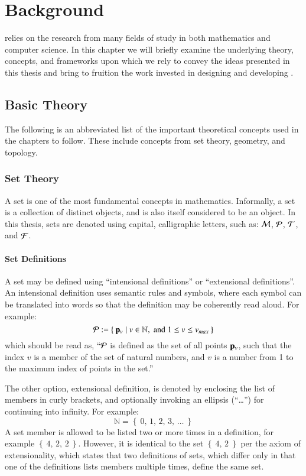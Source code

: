 \chapter{Background}
\label{ch2}
 relies on the research from many fields of study in both mathematics and computer science. In this chapter we will briefly examine the underlying theory, concepts, and frameworks upon which we rely to convey the ideas presented in this thesis and bring to fruition the work invested in designing and developing .

%
%
%
%
\section{Basic Theory}
The following is an abbreviated list of the important theoretical concepts used in the chapters to follow. These include concepts from set theory, geometry, and topology.

%
%
\subsection{Set Theory}
A set is one of the most fundamental concepts in mathematics. Informally, a set is a collection of distinct objects, and is also itself considered to be an object. In this thesis, sets are denoted using capital, calligraphic letters, such as: $\mathcal{M}$, $\mathcal{P}$, $\mathcal{T}$, and $\mathcal{F}$.

%
\subsubsection{Set Definitions}
A set may be defined using ``intensional definitions'' or ``extensional definitions''. An intensional definition uses semantic rules and symbols, where each symbol can be translated into words so that the definition may be coherently read aloud. For example:
%
\begin{equation}
	\mathcal{P} := \left \{\:\mathbf{p}_v \mid v \in \mathbb{N}, \;\text{and}\; 1\leq v \leq v_{max}\:\right \}
\end{equation}
%
which should be read as, ``$\mathcal{P}$ is defined as the set of all points $\mathbf{p}_v$, such that the index $v$ is a member of the set of natural numbers, and $v$ is a number from 1 to the maximum index of points in the set.''

The other option, extensional definition, is denoted by enclosing the list of members in curly brackets, and optionally invoking an ellipsis (``\dots'') for continuing into infinity. For example:
%
\begin{equation}
	\mathbb{N} = \left \{\:0,\,1,\,2,\,3,\,\ldots\:\right \}
\end{equation}
%
A set member is allowed to be listed two or more times in a definition, for example $\left \{\:4,\,2,\,2\:\right \}$. However, it is identical to the set $\left \{\:4,\,2\:\right \}$ per the axiom of extensionality, which states that two definitions of sets, which differ only in that one of the definitions lists members multiple times, define the same set.

